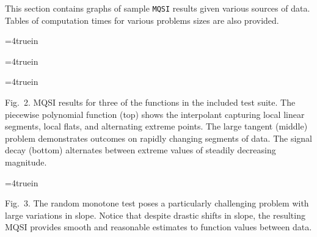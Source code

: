 
This section contains graphs of sample {\tt MQSI} results given
various sources of data. Tables of computation times for various
problems sizes are also provided.

\midinsert
\centerline{\epsfxsize=4truein }
\centerline{\epsfxsize=4truein }
\centerline{\epsfxsize=4truein }
{\narrower\noindent\rmVIII Fig.\ 2.
{\ttVIII MQSI} results for three of the functions in the included test
suite. The {\itVIII piecewise polynomial} function (top) shows the
interpolant capturing local linear segments, local flats, and
alternating extreme points. The {\itVIII large tangent} (middle)
problem demonstrates outcomes on rapidly changing segments of data.
The {\itVIII signal decay} (bottom) alternates between extreme values
of steadily decreasing magnitude.
\par}
\endinsert

\midinsert
\centerline{\epsfxsize=4truein }
{\narrower\noindent\rmVIII Fig.\ 3.
The {\itVIII random monotone} test poses a particularly challenging
problem with large variations in slope. Notice that despite drastic
shifts in slope, the resulting {\ttVIII MQSI} provides smooth and
reasonable estimates to function values between data.
\par}
\endinsert
